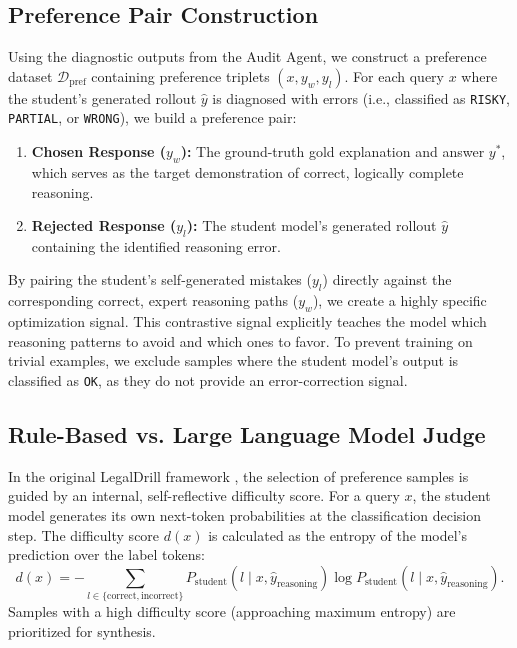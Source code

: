\subsection{Preference Pair Construction}

Using the diagnostic outputs from the Audit Agent, we construct a preference dataset $\mathcal{D}_{\text{pref}}$ containing preference triplets $(x, y_w, y_l)$. For each query $x$ where the student's generated rollout $\hat{y}$ is diagnosed with errors (i.e., classified as \texttt{RISKY}, \texttt{PARTIAL}, or \texttt{WRONG}), we build a preference pair:
\begin{enumerate}
    \item \textbf{Chosen Response ($y_w$):} The ground-truth gold explanation and answer $y^*$, which serves as the target demonstration of correct, logically complete reasoning.
    \item \textbf{Rejected Response ($y_l$):} The student model's generated rollout $\hat{y}$ containing the identified reasoning error.
\end{enumerate}
By pairing the student's self-generated mistakes ($y_l$) directly against the corresponding correct, expert reasoning paths ($y_w$), we create a highly specific optimization signal. This contrastive signal explicitly teaches the model which reasoning patterns to avoid and which ones to favor. To prevent training on trivial examples, we exclude samples where the student model's output is classified as \texttt{OK}, as they do not provide an error-correction signal.

\subsection{Rule-Based vs. Large Language Model Judge}

In the original LegalDrill framework \parencite{li2026legaldrilldiagnosisdrivensynthesislegal}, the selection of preference samples is guided by an internal, self-reflective difficulty score. For a query $x$, the student model generates its own next-token probabilities at the classification decision step. The difficulty score $d(x)$ is calculated as the entropy of the model's prediction over the label tokens:
\begin{equation}
    d(x) = -\sum_{l \in \{\text{correct}, \text{incorrect}\}} P_{\text{student}}(l \mid x, \hat{y}_{\text{reasoning}}) \log P_{\text{student}}(l \mid x, \hat{y}_{\text{reasoning}}).
\end{equation}
Samples with a high difficulty score (approaching maximum entropy) are prioritized for synthesis.

